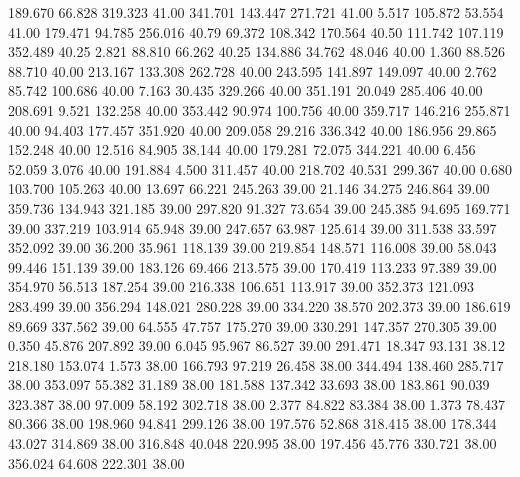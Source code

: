  189.670   66.828  319.323        41.00
 341.701  143.447  271.721        41.00
   5.517  105.872   53.554        41.00
 179.471   94.785  256.016        40.79
  69.372  108.342  170.564        40.50
 111.742  107.119  352.489        40.25
   2.821   88.810   66.262        40.25
 134.886   34.762   48.046        40.00
   1.360   88.526   88.710        40.00
 213.167  133.308  262.728        40.00
 243.595  141.897  149.097        40.00
   2.762   85.742  100.686        40.00
   7.163   30.435  329.266        40.00
 351.191   20.049  285.406        40.00
 208.691    9.521  132.258        40.00
 353.442   90.974  100.756        40.00
 359.717  146.216  255.871        40.00
  94.403  177.457  351.920        40.00
 209.058   29.216  336.342        40.00
 186.956   29.865  152.248        40.00
  12.516   84.905   38.144        40.00
 179.281   72.075  344.221        40.00
   6.456   52.059    3.076        40.00
 191.884    4.500  311.457        40.00
 218.702   40.531  299.367        40.00
   0.680  103.700  105.263        40.00
  13.697   66.221  245.263        39.00
  21.146   34.275  246.864        39.00
 359.736  134.943  321.185        39.00
 297.820   91.327   73.654        39.00
 245.385   94.695  169.771        39.00
 337.219  103.914   65.948        39.00
 247.657   63.987  125.614        39.00
 311.538   33.597  352.092        39.00
  36.200   35.961  118.139        39.00
 219.854  148.571  116.008        39.00
  58.043   99.446  151.139        39.00
 183.126   69.466  213.575        39.00
 170.419  113.233   97.389        39.00
 354.970   56.513  187.254        39.00
 216.338  106.651  113.917        39.00
 352.373  121.093  283.499        39.00
 356.294  148.021  280.228        39.00
 334.220   38.570  202.373        39.00
 186.619   89.669  337.562        39.00
  64.555   47.757  175.270        39.00
 330.291  147.357  270.305        39.00
   0.350   45.876  207.892        39.00
   6.045   95.967   86.527        39.00
 291.471   18.347   93.131        38.12
 218.180  153.074    1.573        38.00
 166.793   97.219   26.458        38.00
 344.494  138.460  285.717        38.00
 353.097   55.382   31.189        38.00
 181.588  137.342   33.693        38.00
 183.861   90.039  323.387        38.00
  97.009   58.192  302.718        38.00
   2.377   84.822   83.384        38.00
   1.373   78.437   80.366        38.00
 198.960   94.841  299.126        38.00
 197.576   52.868  318.415        38.00
 178.344   43.027  314.869        38.00
 316.848   40.048  220.995        38.00
 197.456   45.776  330.721        38.00
 356.024   64.608  222.301        38.00
